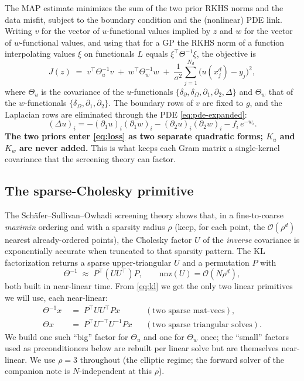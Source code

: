 \documentclass[11pt]{article}
\newcommand{\T}{^{\!\top}}
\newcommand{\inv}{^{-1}}
\newcommand{\Th}{\Theta}
\newcommand{\bigO}{\mathcal{O}}
\begin{document}
The MAP estimate minimizes the sum of the two prior RKHS norms and the data
misfit, subject to the boundary condition and the (nonlinear) PDE link. Writing
$v$ for the vector of $u$-functional values implied by $z$ and $w$ for the
vector of $w$-functional values, and using that for a GP the RKHS norm of a
function interpolating values $\xi$ on functionals $L$ equals $\xi\T\Theta\inv
\xi$, the objective is
\begin{equation}\label{eq:loss}
J(z) \;=\; v\T \Th_u\inv v \;+\; w\T \Th_w\inv w
        \;+\; \frac{1}{\sigma^2}\sum_{j=1}^{N_d}\bigl(u(x_j^d)-y_j\bigr)^2,
\end{equation}
where $\Th_u$ is the covariance of the $u$-functionals $\{\delta_\partial,
\delta_\Omega,\partial_1,\partial_2,\Delta\}$ and $\Th_w$ that of the
$w$-functionals $\{\delta_\Omega,\partial_1,\partial_2\}$. The boundary rows of
$v$ are fixed to $g$, and the Laplacian rows are eliminated through the PDE
\eqref{eq:pde-expanded}:
\begin{equation}\label{eq:v3}
(\Delta u)_i = -(\partial_1 u)_i (\partial_1 w)_i
              -(\partial_2 u)_i (\partial_2 w)_i - f_i\, e^{-w_i}.
\end{equation}
\textbf{The two priors enter \eqref{eq:loss} as two separate quadratic forms;
$K_u$ and $K_w$ are never added.} This is what keeps each Gram matrix a
single-kernel covariance that the screening theory can factor.

\subsection{The sparse-Cholesky primitive}\label{sec:kl}

The Schäfer--Sullivan--Owhadi screening theory shows that, in a fine-to-coarse
\emph{maximin} ordering and with a sparsity radius $\rho$ (keep, for each point,
the $\bigO(\rho^d)$ nearest already-ordered points), the Cholesky factor $U$ of
the \emph{inverse} covariance is exponentially accurate when truncated to that
sparsity pattern. The KL factorization returns a sparse upper-triangular $U$ and
a permutation $P$ with
\begin{equation}\label{eq:kl}
\Theta\inv \;\approx\; P\T (U U\T) P ,
\qquad \mathrm{nnz}(U)=\bigO(N\rho^d),
\end{equation}
both built in near-linear time. From \eqref{eq:kl} we get the only two linear
primitives we will use, each near-linear:
\begin{equation}\label{eq:prims}
\begin{aligned}
\Theta\inv x &\;=\; P\T U U\T P x &&(\text{two sparse mat-vecs}),\\
\Theta x &\;=\; P\T U^{-\!\top} U\inv P x &&(\text{two sparse triangular solves}).
\end{aligned}
\end{equation}
We build one such ``big'' factor for $\Th_u$ and one for $\Th_w$ once; the
``small'' factors used as preconditioners below are rebuilt per linear solve but
are themselves near-linear. We use $\rho=3$ throughout (the elliptic regime;
the forward solver of the companion note is $N$-independent at this $\rho$).
\end{document}
